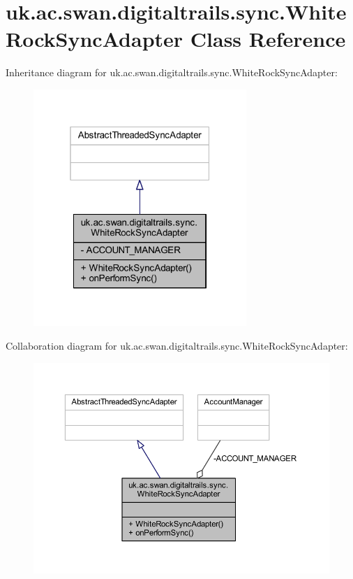 \hypertarget{classuk_1_1ac_1_1swan_1_1digitaltrails_1_1sync_1_1_white_rock_sync_adapter}{\section{uk.\+ac.\+swan.\+digitaltrails.\+sync.\+White\+Rock\+Sync\+Adapter Class Reference}
\label{classuk_1_1ac_1_1swan_1_1digitaltrails_1_1sync_1_1_white_rock_sync_adapter}
}


Inheritance diagram for uk.\+ac.\+swan.\+digitaltrails.\+sync.\+White\+Rock\+Sync\+Adapter\+:
\nopagebreak
\begin{figure}[H]
\begin{center}
\leavevmode
\includegraphics[width=229pt]{classuk_1_1ac_1_1swan_1_1digitaltrails_1_1sync_1_1_white_rock_sync_adapter__inherit__graph}
\end{center}
\end{figure}


Collaboration diagram for uk.\+ac.\+swan.\+digitaltrails.\+sync.\+White\+Rock\+Sync\+Adapter\+:
\nopagebreak
\begin{figure}[H]
\begin{center}
\leavevmode
\includegraphics[width=350pt]{classuk_1_1ac_1_1swan_1_1digitaltrails_1_1sync_1_1_white_rock_sync_adapter__coll__graph}
\end{center}
\end{figure}
